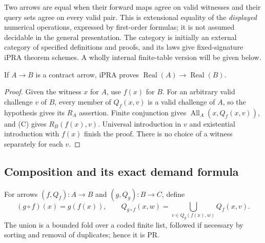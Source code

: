 Two arrows are equal when their forward maps agree on valid witnesses and
their query sets agree on every valid pair.  This is extensional equality of the
\emph{displayed} numerical operations, expressed by first-order formulas; it is
not assumed decidable in the general presentation.  The category is initially
an external category of specified definitions and proofs, and its laws give
fixed-signature iPRA theorem schemes.  A wholly internal finite-table version
will be given below.

\begin{proposition}
If $A\to B$ is a contract arrow, iPRA proves
$\operatorname{Real}(A)\to\operatorname{Real}(B)$.
\end{proposition}
\begin{proof}
Given the witness $x$ for $A$, use $f(x)$ for $B$.  For an arbitrary valid
challenge $v$ of $B$, every member of $Q_f(x,v)$ is a valid challenge of $A$,
so the hypothesis gives its $R_A$ assertion.  Finite conjunction gives
$\operatorname{All}_A(x,Q_f(x,v))$, and (C) gives $R_B(f(x),v)$.  Universal
introduction in $v$ and existential introduction with $f(x)$ finish the proof.
There is no choice of a witness separately for each $v$.
\end{proof}

\subsection{Composition and its exact demand formula}

For arrows $(f,Q_f):A\to B$ and $(g,Q_g):B\to C$, define
\[
 (g\circ f)(x)=g(f(x)),\qquad
 Q_{g\circ f}(x,w)=
       \bigcup_{v\in Q_g(f(x),w)}Q_f(x,v).             \tag{D}
\]
The union is a bounded fold over a coded finite list, followed if necessary by
sorting and removal of duplicates; hence it is PR.


